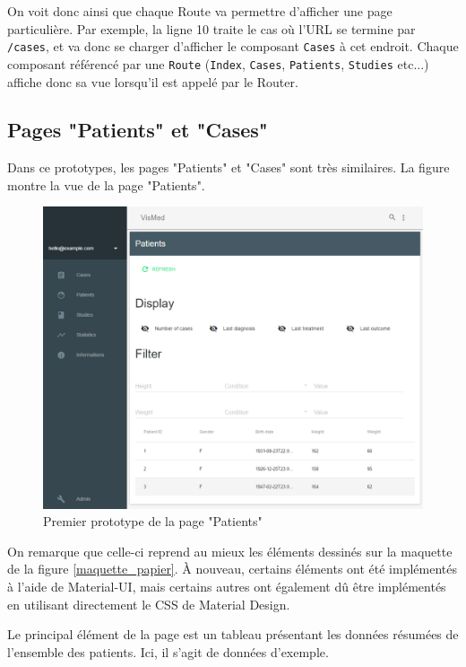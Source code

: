 		On voit donc ainsi que chaque Route va permettre d'afficher une page particulière. Par exemple, la ligne 10 traite le cas où l'URL se termine par \texttt{/cases}, et va donc se charger d'afficher le composant \texttt{Cases} à cet endroit. Chaque composant référencé par une \texttt{Route} (\texttt{Index}, \texttt{Cases}, \texttt{Patients}, \texttt{Studies} etc...) affiche donc sa vue lorsqu'il est appelé par le Router.

	\subsection{Pages "Patients" et "Cases"}

		Dans ce prototypes, les pages "Patients" et "Cases" sont très similaires. La figure montre la vue de la page "Patients".

		\begin{figure}[!ht]
			\centering
			\includegraphics[width=1\textwidth]{images/realisation/proto1_2}
			\caption{Premier prototype de la page "Patients"}
			\label{proto1_2}
		\end{figure}

		On remarque que celle-ci reprend au mieux les éléments dessinés sur la maquette de la figure \ref{maquette_papier}. À nouveau, certains éléments ont été implémentés à l'aide de Material-UI, mais certains autres ont également dû être implémentés en utilisant directement le CSS de Material Design.

		Le principal élément de la page est un tableau présentant les données résumées de l'ensemble des patients. Ici, il s'agit de données d'exemple.

